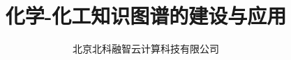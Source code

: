 
\title{化学-化工知识图谱的建设与应用}
\author[ ]{北京北科融智云计算科技有限公司}%
\renewcommand*{\Authfont}{\small\rm} %
\renewcommand*{\Affilfont}{\small\it} %
\renewcommand\Authands{ and } %
\renewcommand\Authands{ , } %
\date{} %




